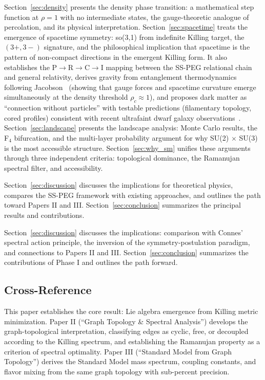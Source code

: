 Section~\ref{sec:density} presents the density phase transition: a mathematical step function at $\rho = 1$ with no intermediate states, the gauge-theoretic analogue of percolation, and its physical interpretation. Section~\ref{sec:spacetime} treats the emergence of spacetime symmetry: so(3,1) from indefinite Killing target, the $(3+,3-)$ signature, and the philosophical implication that spacetime is the pattern of non-compact directions in the emergent Killing form. It also establishes the P$\to$R$\to$C$\to$I mapping between the SS-PEG relational chain and general relativity, derives gravity from entanglement thermodynamics following Jacobson~\cite{Jacobson1995,Jacobson1998} (showing that gauge forces and spacetime curvature emerge simultaneously at the density threshold $\rho_c \approx 1$), and proposes dark matter as ``connection without particles'' with testable predictions (filamentary topology, cored profiles) consistent with recent ultrafaint dwarf galaxy observations~\cite{SanchezAlmeitaTrujilloPlastino2024}. Section~\ref{sec:landscape} presents the landscape analysis: Monte Carlo results, the F$_4$ bifurcation, and the multi-layer probability argument for why SU(2) $\times$ SU(3) is the most accessible structure. Section~\ref{sec:why_sm} unifies these arguments through three independent criteria: topological dominance, the Ramanujan spectral filter, and accessibility.

Section~\ref{sec:discussion} discusses the implications for theoretical physics, compares the SS-PEG framework with existing approaches, and outlines the path toward Papers II and III. Section~\ref{sec:conclusion} summarizes the principal results and contributions.

Section~\ref{sec:discussion} discusses the implications: comparison with Connes' spectral action principle, the inversion of the symmetry-postulation paradigm, and connections to Papers II and III. Section~\ref{sec:conclusion} summarizes the contributions of Phase I and outlines the path forward.

\subsection{Cross-Reference}\label{sec:cross-reference}

This paper establishes the core result: Lie algebra emergence from Killing metric minimization. Paper II (``Graph Topology \& Spectral Analysis'') develops the graph-topological interpretation, classifying edges as cyclic, free, or decoupled according to the Killing spectrum, and establishing the Ramanujan property as a criterion of spectral optimality. Paper III (``Standard Model from Graph Topology'') derives the Standard Model mass spectrum, coupling constants, and flavor mixing from the same graph topology with sub-percent precision.

